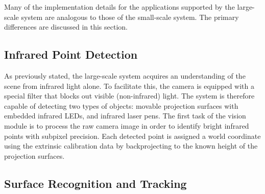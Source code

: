\documentclass{thesis}
\begin{document}
Many of the implementation details for the applications supported by the large-scale system are analogous to those of the small-scale system. The primary differences are discussed in this section.

\subsection{Infrared Point Detection}

As previously stated, the large-scale system acquires an understanding of the scene from infrared light alone. To facilitate this, the camera is equipped with a special filter that blocks out visible (non-infrared) light. The system is therefore capable of detecting two types of objects: movable projection surfaces with embedded infrared LEDs, and infrared laser pens. The first task of the vision module is to process the raw camera image in order to identify bright infrared points with subpixel precision. Each detected point is assigned a world coordinate using the extrinsic calibration data by backprojecting to the known height of the projection surfaces.

\subsection{Surface Recognition and Tracking}
\end{document}
